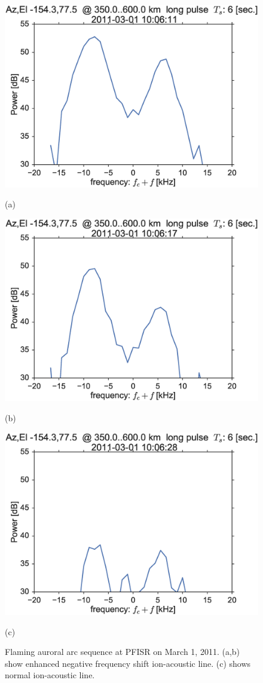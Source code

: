 \begin{figure}\centering
    \includegraphics[width=0.5\columnwidth,trim=0 50 0 0]{gfx/2011-03-01/acfslice_longpulse2011-03-0110-06-11}
    
    \vspace{-1cm}(a)
    \vspace{1cm}
    
    \includegraphics[width=0.5\columnwidth,trim=0 50 0 0]{gfx/2011-03-01/acfslice_longpulse2011-03-0110-06-17}
    
    \vspace{-1cm}(b)
    \vspace{1cm}
    
    \includegraphics[width=0.5\columnwidth,trim=0 50 0 0]{gfx/2011-03-01/acfslice_longpulse2011-03-0110-06-28}
    
    \vspace{-1cm}(c)
    \vspace{1cm}
    
	
	\caption{Flaming auroral arc sequence at PFISR on March 1, 2011. 
    (a,b) show enhanced negative frequency shift ion-acoustic line. 
    (c) shows normal ion-acoustic line.}
    \label{fig:20110301b}
\end{figure}

